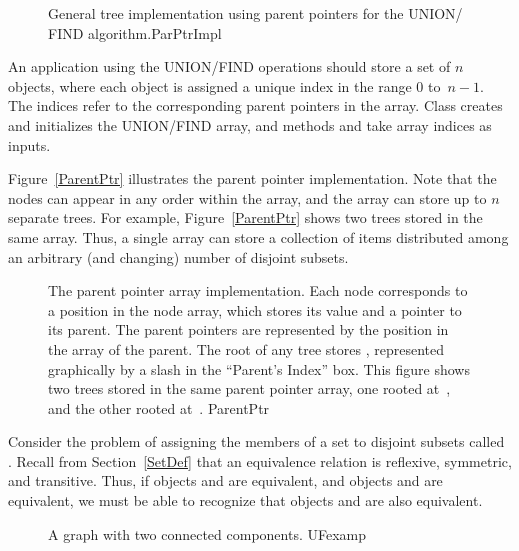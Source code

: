 \begin{figure}
\bigskip
{}
\vspace{-\bigskipamount}

{General tree implementation using parent pointers for the UNION/ FIND
algorithm.}{ParPtrImpl}
\end{figure}

An application using the UNION/FIND operations
should store a set of \(n\) objects, where each object is assigned a
unique index in the range 0 to~\(n-1\).
The indices refer to the corresponding parent pointers in the array.
Class  creates and initializes the
UNION/FIND array, and methods  and
 take array indices as inputs.

Figure~\ref{ParentPtr} illustrates the parent pointer implementation.
Note that the nodes can appear in any order within the array, and
the array can store up to \(n\) separate trees.
For example, Figure~\ref{ParentPtr} shows two trees stored in the same
array.
Thus, a single array can store a collection of items distributed among
an arbitrary (and changing) number of disjoint subsets.

\begin{figure}
\smallskip
{}
{The parent pointer array implementation.
Each node corresponds to a position in the node array,
which stores its value and a pointer to its parent.
The parent pointers are represented by the position in the array
of the parent.
The root of any tree stores , represented graphically by a
slash in the ``Parent's Index'' box.
This figure shows two trees stored in the same parent pointer array,
one rooted at~, and the other rooted at~.}
{ParentPtr}
\bigskip
\end{figure}

Consider the problem of assigning the members of a set to
disjoint subsets called
.
Recall from Section~\ref{SetDef} that an equivalence relation is
reflexive, symmetric, and transitive.
Thus, if objects  and  are equivalent, and objects
 and  are equivalent, we must be able to recognize
that objects  and  are also equivalent.

\begin{figure}
\vspace{-\bigskipamount}
\vspace{-\bigskipamount}

{A graph with two connected components.}
{UFexamp}
\end{figure}

